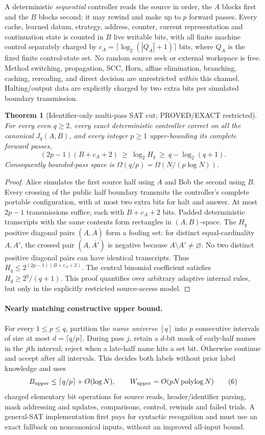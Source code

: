 \documentclass[11pt]{article}
\newtheorem{theorem}{Theorem}
\begin{document}
A deterministic \emph{sequential} controller reads the source in order, the $A$ blocks first and the $B$ blocks second; it may rewind and make up to $p$ forward passes. Every cache, learned datum, strategy, address, counter, current representation and continuation state is counted in $B$ live writable bits, with all finite machine control separately charged by $c_A=\lceil\log_2(|Q_A|+1)\rceil$ bits, where $Q_A$ is the fixed finite control-state set. No random source seek or external workspace is free. Method switching, propagation, SCC, Horn, affine elimination, branching, caching, rereading, and direct decision are unrestricted \emph{within} this channel. Halting/output data are explicitly charged by two extra bits per simulated boundary transmission.

\begin{theorem}[Identifier-only multi-pass SAT cut; PROVED/EXACT restricted]
For every even $q\ge2$, every exact deterministic controller correct on all the canonical $J_q(A,B)$, and every integer $p\ge1$ upper-bounding its complete forward passes,
\[
\boxed{(2p-1)(B+c_A+2)\ \ge\ \log_2 H_q
\ \ge\ q-\log_2(q+1).}
\tag{5}
\]
Consequently bounded-pass space is $\Omega(q/p)=\Omega(N/(p\log N))$.
\end{theorem}
\begin{proof}
Alice simulates the first source half using $A$ and Bob the second using $B$. Every crossing of the public half boundary transmits the controller's complete portable configuration, with at most two extra bits for halt and answer. At most $2p-1$ transmissions suffice, each with $B+c_A+2$ bits. Padded deterministic transcripts with the same contents form rectangles in $(A,B)$-space. The $H_q$ positive diagonal pairs $(A,\overline A)$ form a fooling set: for distinct equal-cardinality $A,A'$, the crossed pair $(A,\overline{A'})$ is negative because $A\setminus A'\ne\varnothing$. No two distinct positive diagonal pairs can have identical transcripts. Thus $H_q\le2^{(2p-1)(B+c_A+2)}$. The central binomial coefficient satisfies $H_q\ge2^q/(q+1)$. This proof quantifies over arbitrary adaptive internal rules, but only in the explicitly restricted source-access model.
\end{proof}

\paragraph{Nearly matching constructive upper bound.}
For every $1\le p\le q$, partition the \emph{name universe} $[q]$ into $p$ consecutive intervals of size at most $d=\lceil q/p\rceil$. During pass $j$, retain a $d$-bit mask of early-half names in the $j$th interval; reject when a late-half name hits a set bit. Otherwise continue and accept after all intervals. This decides both labels without prior label knowledge and uses
\[
B_{\rm upper}\le \lceil q/p\rceil+O(\log N),\qquad
W_{\rm upper}=O(pN\operatorname{polylog}N)
\tag{6}
\]
charged elementary bit operations for source reads, header/identifier parsing, mask addressing and updates, comparisons, control, rewinds and failed trials. A general-SAT implementation first pays for syntactic recognition and must use an exact fallback on noncanonical inputs, without an improved all-input bound.
\end{document}
